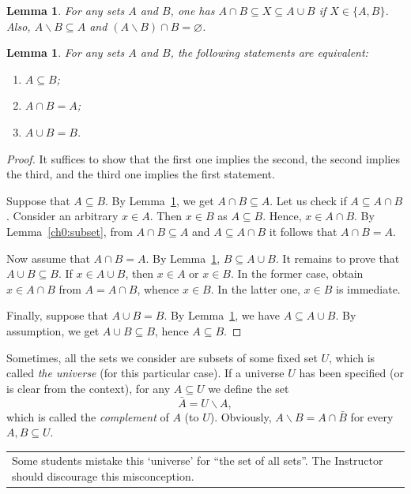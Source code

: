 \documentclass[12pt,notitlepage]{article}
\theoremstyle{plain}
\newtheorem{lemma}[thm]{Lemma}
\theoremstyle{definition}
\theoremstyle{plain}
\newcommand{\sbs}{\subseteq}
\renewcommand{\setminus}{\smallsetminus}
\newcommand{\void}{\varnothing}
\newcommand{\1}{\mathbf{1}}
\newcommand{\0}{\mathbf{0}}
\newcommand{\mcomm}[1]{
\medskip\noindent\begin{tabular}{| l}
\parbox{0.99\textwidth}{{\small
#1 }}\end{tabular}
\smallskip}
\begin{document}
\begin{lemma}\label{ch0:l3}
For any sets $A$ and $B$, one has $A \cap B \sbs X \sbs A \cup B$ if $X \in \{A,B\}$. Also, $A \setminus B \sbs A$ and $(A \setminus B) \cap B = \void$.
\end{lemma}
\begin{lemma}\label{ch0:lattice}
For any sets $A$ and $B$, the following statements are equivalent:
\begin{enumerate}
\item $A \sbs B$;
\item $A \cap B = A$;
\item $A \cup B = B$.
\end{enumerate}
\end{lemma}
\begin{proof}
It suffices to show that the first one implies the second, the second implies the third, and the third one implies the first statement.

Suppose that $A \sbs B$. By Lemma~\ref{ch0:l3}, we get $A \cap B \sbs A$. Let us check if $A \sbs A \cap B$. Consider an arbitrary $x \in A$. Then $x \in B$ as $A \sbs B$. Hence, $x \in A \cap B$. By Lemma~\ref{ch0:subset}, from $A \cap B \sbs A$ and $A \sbs A \cap B$ it follows that $A \cap B = A$.

Now assume that $A \cap B = A$. By Lemma~\ref{ch0:l3}, $B \sbs A \cup B$. It remains to prove that $A \cup B \sbs B$. If $x \in A \cup B$, then $x \in A$ or $x \in B$. In the former case, obtain $x \in A \cap B$ from $A = A \cap B$, whence $x \in B$. In the latter one, $x \in B$ is immediate.

Finally, suppose that $A \cup B = B$. By Lemma~\ref{ch0:l3}, we have $A \sbs A \cup B$. By assumption, we get $A \cup B \sbs B$, hence $A \sbs B$.
\end{proof}

Sometimes, all the sets we consider are subsets of some fixed set $U$, which is called \emph{the universe} (for this particular case). If a universe $U$ has been specified (or is clear from the context), for any $A \sbs U$ we define the set
$$\bar A = U \setminus A,$$
which is called the \emph{complement} of $A$ (to $U$). Obviously, $A \setminus B = A \cap \bar B$ for every $A, B \sbs U$.

\mcomm{Some students mistake this `universe' for ``the set of all sets''. The Instructor should discourage this misconception.}
\end{document}
